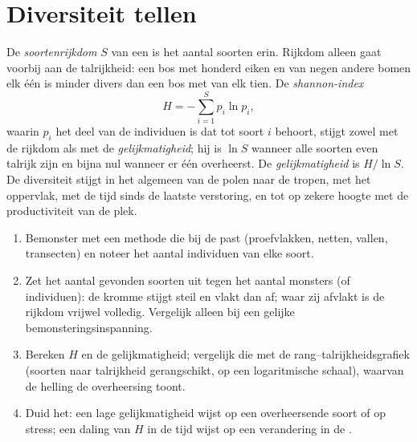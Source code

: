 \section{Diversiteit tellen}

\begin{definition}\label{def:b1:ecosystem-organization:diversity}
De \emph{soortenrijkdom} $S$ van een  is het aantal soorten
erin. Rijkdom alleen gaat voorbij aan de talrijkheid: een bos met honderd
eiken en van negen andere bomen elk één is minder divers dan een bos met van
elk tien. De \emph{shannon-index}
\[
H = -\sum_{i=1}^{S} p_i \ln p_i ,
\]
waarin $p_i$ het deel van de individuen is dat tot soort $i$ behoort, stijgt
zowel met de rijkdom als met de \emph{gelijkmatigheid}; hij is $\ln S$
wanneer alle soorten even talrijk zijn en bijna nul wanneer er één
overheerst. De \emph{gelijkmatigheid} is $H/\ln S$. De diversiteit stijgt in
het algemeen van de polen naar de tropen, met het oppervlak, met de tijd
sinds de laatste verstoring, en tot op zekere hoogte met de productiviteit
van de plek.
\end{definition}

\begin{method}\label{met:b1:ecosystem-organization:sampling}
\begin{enumerate}
  \item Bemonster met een methode die bij de  past
        (proefvlakken, netten, vallen, transecten) en noteer het aantal
        individuen van elke soort.
  \item Zet het aantal gevonden soorten uit tegen het aantal monsters (of
        individuen): de kromme stijgt steil en vlakt dan af; waar zij
        afvlakt is de rijkdom vrijwel volledig. Vergelijk
         alleen bij een gelijke bemonsteringsinspanning.
  \item Bereken $H$ en de gelijkmatigheid; vergelijk die met de
        rang--talrijkheidsgrafiek (soorten naar talrijkheid gerangschikt,
        op een logaritmische schaal), waarvan de helling de overheersing
        toont.
  \item Duid het: een lage gelijkmatigheid wijst op een overheersende soort
        of op stress; een daling van $H$ in de tijd wijst op een
        verandering in de .
\end{enumerate}
\end{method}

